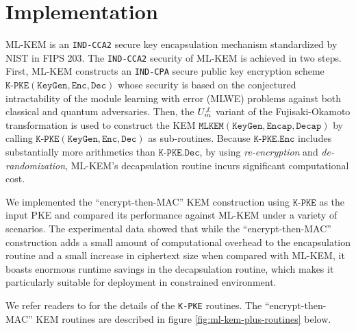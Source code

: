 \documentclass[journal=tches,submission]{iacrtrans}
\newcommand{\keygen}{\texttt{KeyGen}}
\newcommand{\encrypt}{\texttt{Enc}}
\newcommand{\decrypt}{\texttt{Dec}}
\newcommand{\encap}{\texttt{Encap}}
\newcommand{\decap}{\texttt{Decap}}
\begin{document}
\section{Implementation}\label{sec:implementation}
ML-KEM is an \texttt{IND-CCA2} secure key encapsulation mechanism standardized by NIST in FIPS 203. The \texttt{IND-CCA2} security of ML-KEM is achieved in two steps. First, ML-KEM constructs an \texttt{IND-CPA} secure public key encryption scheme $\texttt{K-PKE}(\keygen, \encrypt, \decrypt)$ whose security is based on the conjectured intractability of the module learning with error (MLWE) problems against both classical and quantum adversaries. Then, the $U^{\not\bot}_m$ variant of the Fujisaki-Okamoto transformation is used to construct the KEM $\texttt{MLKEM}(\keygen, \encap, \decap)$ by calling $\texttt{K-PKE}(\keygen, \encrypt, \decrypt)$ as sub-routines. Because $\texttt{K-PKE}.\encrypt$ includes substantially more arithmetics than $\texttt{K-PKE}.\decrypt$, by using \textit{re-encryption} and \textit{de-randomization}, ML-KEM's decapsulation routine incurs significant computational cost. 

We implemented the ``encrypt-then-MAC'' KEM construction using $\texttt{K-PKE}$ as the input PKE and compared its performance against ML-KEM under a variety of scenarios. The experimental data showed that while the ``encrypt-then-MAC'' construction adds a small amount of computational overhead to the encapsulation routine and a small increase in ciphertext size when compared with ML-KEM, it boasts enormous runtime savings in the decapsulation routine, which makes it particularly suitable for deployment in constrained environment.

We refer readers to \cite{FIPS203} for the details of the \texttt{K-PKE} routines. The ``encrypt-then-MAC'' KEM routines are described in figure \ref{fig:ml-kem-plus-routines} below.
\end{document}
